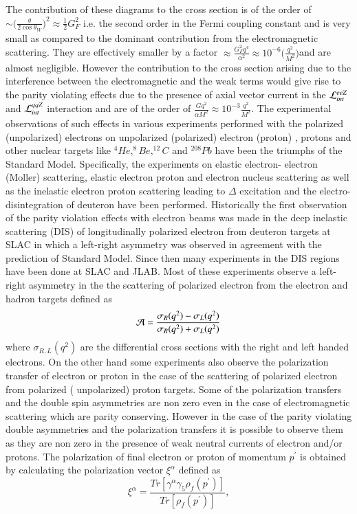   The contribution of these diagrams to the  cross section is of the order of $\sim \big(\frac{g}{2\cos\theta_W}\big)^2 \approx \frac{1}{2}G_F^2$ i.e. the second order in the  Fermi coupling constant and is very small as compared to the dominant contribution from the electromagnetic scattering. They are effectively smaller by a factor $\approx \frac{G_F^2q^4}{\alpha^2}\approx 10^{-6}\big(\frac{q^2}{M^2}\big)$and are almost negligible. However the contribution to the cross section arising due to the interference between the electromagnetic and the weak terms would give rise to the parity violating effects due to the presence of axial vector current in the ${\cal L}_{int}^{eeZ}$and ${\cal L}_{int}^{qqZ}$ interaction and are of the order of $\frac{Gq^2}{\alpha M^2}\approx 10^{-3} \frac{q^2}{M^2}$. The experimental observations of such effects in various experiments performed with the polarized (unpolarized) electrons on unpolarized (polarized) electron (proton) , protons and other nuclear targets like $ ^4{He},^8{Be},^{12}{C}$ and $^{208}{Pb}$ have been the triumphs of the Standard Model. Specifically, the experiments on elastic electron- electron (Moller) scattering, elastic electron proton and electron nucleus scattering as well as the inelastic electron proton scattering leading to $\Delta$ excitation and the electro-disintegration of deuteron have been performed. Historically the first observation of the parity violation effects with electron beams was made in the deep inelastic scattering (DIS) of longitudinally polarized electron from deuteron targets at SLAC in which a left-right asymmetry was observed  in agreement with the prediction of Standard Model. Since then many experiments in the DIS regions  have been done at SLAC and JLAB. 
Most of these experiments observe a left-right asymmetry in the the scattering of polarized electron  from the electron and hadron targets defined as
\begin{equation}
{\cal A}= \frac{\sigma_R(q^2)-\sigma_L(q^2)}{\sigma_R(q^2)+\sigma_L(q^2)}
\end{equation}
where $\sigma_{R,L}(q^2)$ are the differential cross sections with the right and left handed electrons. On the other hand some experiments also observe the polarization transfer of electron or proton in the case of the scattering of polarized electron from polarized ( unpolarized) proton targets. Some of the polarization transfers and the double spin asymmetries are non zero even in the case of electromagnetic scattering which are parity conserving. However in the case of the parity violating double asymmetries and the polarization transfers it is possible to observe them as they are non zero in the presence of weak neutral currents of electron and/or protons. The polarization of final electron or proton of momentum $p^\prime$ is obtained by calculating the polarization vector $\xi^\alpha$ defined as 
\begin{equation}\label{eq:pol}
\xi^\alpha =\frac{Tr[\gamma^\alpha \gamma_5\rho_f(p^\prime)]}{Tr[ \rho_f(p^\prime)] } ,
\end{equation}

